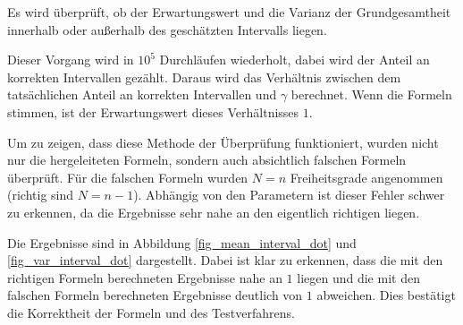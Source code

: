 \documentclass[10pt,twocolumn]{scrartcl}
\begin{document}
		Es wird überprüft, ob der Erwartungswert und die Varianz der Grundgesamtheit innerhalb oder außerhalb des geschätzten Intervalls liegen.

		Dieser Vorgang wird in $10^5$ Durchläufen wiederholt, dabei wird der Anteil an korrekten Intervallen gezählt. Daraus wird das Verhältnis zwischen dem tatsächlichen Anteil an korrekten Intervallen und $\gamma$ berechnet. Wenn die Formeln stimmen, ist der Erwartungswert dieses Verhältnisses $1$.

		Um zu zeigen, dass diese Methode der Überprüfung funktioniert, wurden nicht nur die hergeleiteten Formeln, sondern auch absichtlich falschen Formeln überprüft. Für die falschen Formeln wurden $N = n$ Freiheitsgrade angenommen (richtig sind $N = n-1$). Abhängig von den Parametern ist dieser Fehler schwer zu erkennen, da die Ergebnisse sehr nahe an den eigentlich richtigen liegen.

		Die Ergebnisse sind in Abbildung \ref{fig_mean_interval_dot} und \ref{fig_var_interval_dot} dargestellt. Dabei ist klar zu erkennen, dass die mit den richtigen Formeln berechneten Ergebnisse nahe an $1$ liegen und die mit den falschen Formeln berechneten Ergebnisse deutlich von $1$ abweichen. Dies bestätigt die Korrektheit der Formeln und des Testverfahrens.
\end{document}
